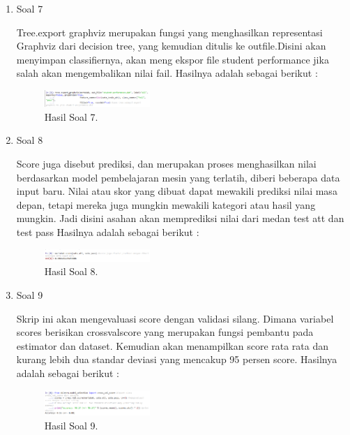 \begin{enumerate}
	\item Soal 7
	\hfill\break
	
	Tree.export graphviz merupakan fungsi yang menghasilkan representasi Graphviz dari decision tree, yang kemudian ditulis ke outfile.Disini akan menyimpan classifiernya, akan meng ekspor file student performance jika salah akan mengembalikan nilai fail. Hasilnya adalah sebagai berikut :
	\begin{figure}[H]
	\centering
		\includegraphics[width=4cm]{figures/1174095/tugas2/materi/hasil7.PNG}
		\caption{Hasil Soal 7.}
	\end{figure}

	\item Soal 8
	\hfill\break
	
	Score juga disebut prediksi, dan merupakan proses menghasilkan nilai berdasarkan model pembelajaran mesin yang terlatih, diberi beberapa data input baru. Nilai atau skor yang dibuat dapat mewakili prediksi nilai masa depan, tetapi mereka juga mungkin mewakili kategori atau hasil yang mungkin. Jadi disini asahan akan memprediksi nilai dari medan test att dan test pass Hasilnya adalah sebagai berikut :
	\begin{figure}[H]
	\centering
		\includegraphics[width=4cm]{figures/1174095/tugas2/materi/hasil8.PNG}
		\caption{Hasil Soal 8.}
	\end{figure}

	\item Soal 9
	\hfill\break
	
	Skrip ini akan mengevaluasi score dengan validasi silang. Dimana variabel scores berisikan crossvalscore yang merupakan fungsi pembantu pada estimator dan dataset. Kemudian akan menampilkan score rata rata dan kurang lebih dua standar deviasi yang mencakup 95 persen score. Hasilnya adalah sebagai berikut :
	\begin{figure}[H]
	\centering
		\includegraphics[width=4cm]{figures/1174095/tugas2/materi/hasil9.PNG}
		\caption{Hasil Soal 9.}
	\end{figure}


\end{enumerate}

